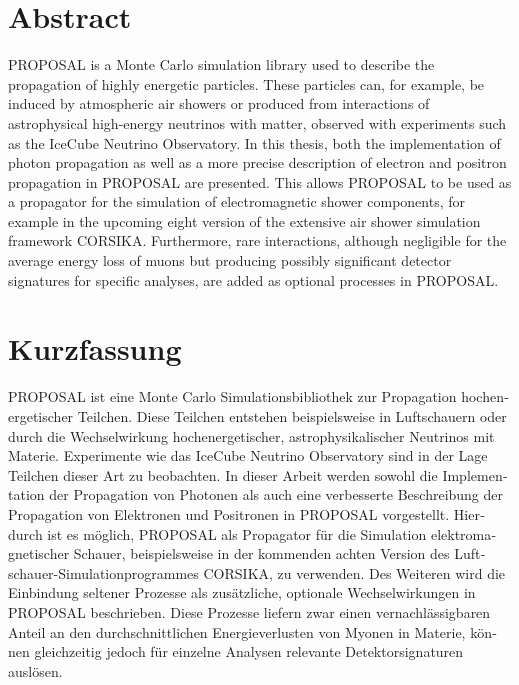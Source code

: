 \thispagestyle{plain}

\section*{Abstract}

PROPOSAL is a \CC Monte Carlo simulation library used to describe the propagation of highly energetic particles. 
These particles can, for example, be induced by atmospheric air showers or produced from interactions of astrophysical high-energy neutrinos with matter, observed with experiments such as the IceCube Neutrino Observatory. 
In this thesis, both the implementation of photon propagation as well as a more precise description of electron and positron propagation in PROPOSAL are presented.
This allows PROPOSAL to be used as a propagator for the simulation of electromagnetic shower components, for example in the upcoming eight version of the extensive air shower simulation framework CORSIKA. 
Furthermore, rare interactions, although negligible for the average energy loss of muons but producing possibly significant detector signatures for specific analyses, are added as optional processes in PROPOSAL.

\section*{Kurzfassung}
\begin{german}

PROPOSAL ist eine \CC Monte Carlo Simulationsbibliothek zur Propagation hochenergetischer Teilchen.
Diese Teilchen entstehen beispielsweise in Luftschauern oder durch die Wechselwirkung hochenergetischer, astrophysikalischer Neutrinos mit Materie.
Experimente wie das IceCube Neutrino Observatory sind in der Lage Teilchen dieser Art zu beobachten.
In dieser Arbeit werden sowohl die Implementation der Propagation von Photonen als auch eine verbesserte Beschreibung der Propagation von Elektronen und Positronen in PROPOSAL vorgestellt.
Hierdurch ist es möglich, PROPOSAL als Propagator für die Simulation elektromagnetischer Schauer, beispielsweise in der kommenden achten Version des Luftschauer-Simulationprogrammes CORSIKA, zu verwenden.
Des Weiteren wird die Einbindung seltener Prozesse als zusätzliche, optionale Wechselwirkungen in PROPOSAL beschrieben.
Diese Prozesse liefern zwar einen vernachlässigbaren Anteil an den durchschnittlichen Energieverlusten von Myonen in Materie, können gleichzeitig jedoch für einzelne Analysen relevante Detektorsignaturen auslösen. 

\end{german}
